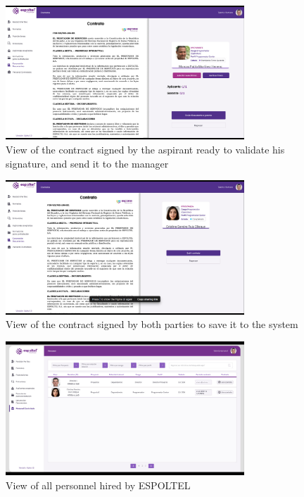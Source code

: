 \documentclass{scrreprt}
\begin{document}
\begin{figure}[H]
	\centering \small
	\includegraphics[width=0.8\textwidth]{WebPrototype/wflow-41.jpeg}
	\caption{View of the contract signed by the aspirant ready to validate his signature, and send it to the manager}
\end{figure}

\begin{figure}[H]
	\centering \small
	\includegraphics[width=0.8\textwidth]{WebPrototype/wflow-42.jpeg}
	\caption{View of the contract signed by both parties to save it to the system}
\end{figure}

\begin{figure}[H]
	\centering \small
	\includegraphics[width=0.8\textwidth]{WebPrototype/wflow-43.jpeg}
	\caption{View of all personnel hired by ESPOLTEL}
\end{figure}
\end{document}

